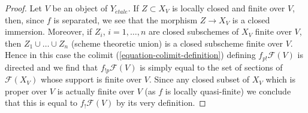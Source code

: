 \documentclass{stacks-project}
\theoremstyle{plain}
\theoremstyle{definition}
\theoremstyle{remark}
\numberwithin{equation}{subsection}
\def\etale{{\acute{e}tale}}
\begin{document}
\begin{proof}
Let $V$ be an object of $Y_\etale$. If $Z \subset X_V$ is locally closed
and finite over $V$, then, since $f$ is separated, we see that
the morphism $Z \to X_V$ is a closed immersion. Moreover, if
$Z_i$, $i = 1, \ldots, n$ are closed subschemes of $X_V$ finite
over $V$, then $Z_1 \cup \ldots \cup Z_n$ (scheme theoretic union)
is a closed subscheme finite over $V$. Hence in this case the colimit
(\ref{equation-colimit-definition}) defining $f_{p!}\mathcal{F}(V)$
is directed and we find that $f_{!p}\mathcal{F}(V)$ is simply equal
to the set of sections of $\mathcal{F}(X_V)$ whose support is finite over $V$.
Since any closed subset of $X_V$ which is proper over $V$ is
actually finite over $V$ (as $f$ is locally quasi-finite)
we conclude that this is equal to $f_!\mathcal{F}(V)$
by its very definition.
\end{proof}
\end{document}
